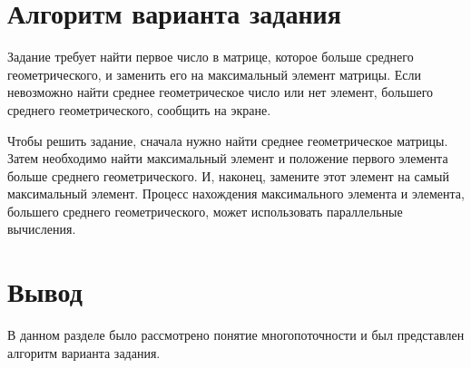 \section{Алгоритм варианта задания}

Задание требует найти первое число в матрице, которое больше среднего геометрического, и заменить его на максимальный элемент матрицы. Если невозможно найти среднее геометрическое число или нет элемент, большего среднего геометрического, сообщить на экране.

Чтобы решить задание, сначала нужно найти среднее геометрическое матрицы. Затем необходимо найти максимальный элемент и положение первого элемента больше среднего геометрического. И, наконец, замените этот элемент на самый максимальный элемент. Процесс нахождения максимального элемента и элемента, большего среднего геометрического, может использовать параллельные вычисления.

\section*{Вывод}

В данном разделе было рассмотрено понятие многопоточности и был представлен алгоритм варианта задания.
